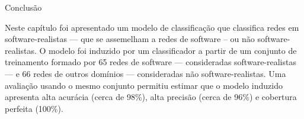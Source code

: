 \begin{section}{Conclusão} \label{cap:clas5}

	Neste capítulo foi apresentado um modelo de classificação que classifica redes em software-realistas --- que se assemelham a redes de software -- ou não software-realistas. O modelo foi induzido por um classificador a partir de um conjunto de treinamento formado por 65 redes de software --- consideradas software-realistas --- e 66 redes de outros domínios --- consideradas não software-realistas. Uma avaliação usando o mesmo conjunto permitiu estimar que o modelo induzido apresenta alta acurácia (cerca de 98\%), alta precisão (cerca de 96\%) e cobertura perfeita (100\%). 

	
\end{section}

